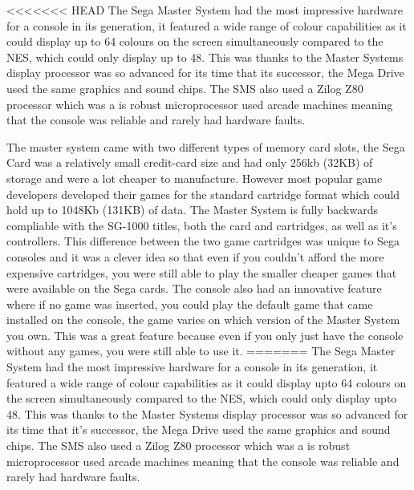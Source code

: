 \documentclass{scrartcl}
\begin{document}
<<<<<<< HEAD
The Sega Master System had the most impressive hardware for a console in its generation, it featured a wide range of colour capabilities as it could display up to 64 colours on the screen simultaneously compared to the NES\cite{racket}, which could only display up to 48. This was thanks to the Master Systems display processor was so advanced for its time that its successor, the Mega Drive used the same graphics and sound chips. The SMS also used a Zilog Z80 processor which was a is robust microprocessor used arcade machines meaning that the console was reliable and rarely had hardware faults.\cite{russell} 

The master system came with two different types of memory card slots, the Sega Card was a relatively small credit-card size and had only 256kb (32KB) of storage and were a lot cheaper to manufacture. However most popular game developers developed their games for the standard cartridge format which could hold up to 1048Kb (131KB) of data. \cite{Weiss2009} The Master System is fully backwards compliable with the SG-1000 titles, both the card and cartridges, as well as it's controllers. \cite{racket} This difference between the two game cartridges was unique to Sega consoles and it was a clever idea so that even if you couldn't afford the more expensive cartridges, you were still able to play the smaller cheaper games that were available on the Sega cards. The console also had an innovative feature where if no game was inserted, you could play the default game that came installed on the console, the game varies on which version of the Master System you own. This was a great feature because even if you only just have the console without any games, you were still able to use it.
=======
The Sega Master System had the most impressive hardware for a console in its generation, it featured a wide range of colour capabilities as it could display upto 64 colours on the screen simultaneously compared to the NES\cite{racket}, which could only display upto 48. This was thanks to the Master Systems display processor was so advanced for its time that it's successor, the Mega Drive used the same graphics and sound chips. The SMS also used a Zilog Z80 processor which was a is robust microprocessor used arcade machines meaning that the console was reliable and rarely had hardware faults.\cite{russell} 
\end{document}
